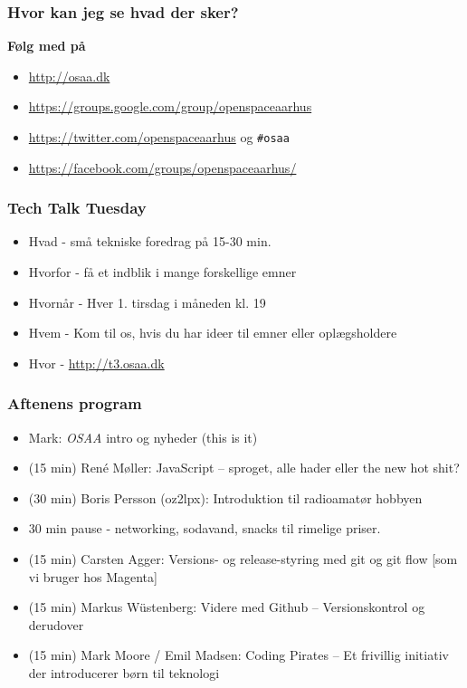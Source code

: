 \documentclass{beamer}
\begin{document}
\begin{frame}
  \frametitle{Hvor kan jeg se hvad der sker?}
  \textbf{Følg med på}
  \begin{itemize}
  \item  \url{http://osaa.dk}
  \item  \url{https://groups.google.com/group/openspaceaarhus}
  \item  \url{https://twitter.com/openspaceaarhus} og \texttt{\#osaa}
  \item  \url{https://facebook.com/groups/openspaceaarhus/}
  \end{itemize}
\end{frame}

\begin{frame}
  \frametitle{Tech Talk Tuesday}
  \begin{itemize}
  \item Hvad - små tekniske foredrag på 15-30 min.
  \item Hvorfor - få et indblik i mange forskellige emner
  \item Hvornår - Hver 1. tirsdag i måneden kl. 19
  \item Hvem - Kom til os, hvis du har ideer til emner eller oplægsholdere
  \item Hvor - \url{http://t3.osaa.dk}
  \end{itemize}
\end{frame}

\begin{frame}
  \frametitle{Aftenens program}
  \begin{itemize}
  \item  Mark: \emph{OSAA} intro og nyheder (this is it)
  \item  (15 min) René Møller: JavaScript – sproget, alle hader eller the new hot shit?
  \item  (30 min) Boris Persson (oz2lpx): Introduktion til radioamatør hobbyen
  \item  30 min pause - networking, sodavand, snacks til rimelige priser.
  \item  (15 min) Carsten Agger: Versions- og release-styring med git og git flow [som vi bruger hos Magenta]
  \item  (15 min) Markus Wüstenberg: Videre med Github – Versionskontrol og derudover
  \item  (15 min) Mark Moore / Emil Madsen: Coding Pirates – \newline Et frivillig initiativ der introducerer børn til teknologi

  \end{itemize}
\end{frame}
\end{document}
